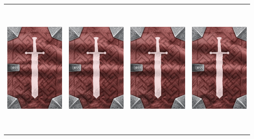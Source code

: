 \documentclass{minimal}
\begin{document}
{\begin{longtable}{llll}
\includegraphics[width=44mm,height=68mm]{./50-56/gh-055-super-healing-potion-back.png} &
\includegraphics[width=44mm,height=68mm]{./50-56/gh-055-super-healing-potion-back.png} &
\includegraphics[width=44mm,height=68mm]{./50-56/gh-055-super-healing-potion-back.png} &
\includegraphics[width=44mm,height=68mm]{./50-56/gh-055-super-healing-potion-back.png}\\ 

\end{longtable}}
\end{document}
